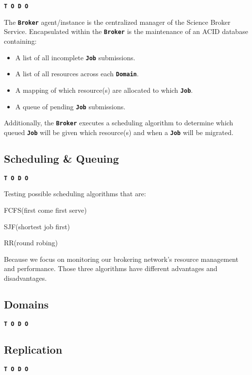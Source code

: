 \documentclass{ReportCUNY}
\newcommand{\KeyWord}[1]{\textbf{\texttt{#1}}}
\begin{document}
\begin{center}\textbf{\texttt{T~O~D~O}}\end{center}

The \KeyWord{Broker} agent/instance is the centralized manager of the Science Broker Service.
Encapsulated within the \KeyWord{Broker} is the maintenance of an ACID database containing:
\begin{itemize}
\item A list of all incomplete \KeyWord{Job} submissions.
\item A list of all resources across each \KeyWord{Domain}.
\item A mapping of which resource(s) are allocated to which \KeyWord{Job}.
\item A queue of pending \KeyWord{Job} submissions.
\end{itemize}

Additionally, the \KeyWord{Broker} executes a scheduling algorithm to determine which queued \KeyWord{Job} will be given which resource(s) and when a \KeyWord{Job} will be migrated.


\subsection{Scheduling \& Queuing}

\begin{center}\textbf{\texttt{T~O~D~O}}\end{center}
Testing possible scheduling algorithms that are:
\item FCFS(first come first serve)
\item SJF(shortest job first)
\item RR(round robing)

Because we focus on monitoring our brokering network's resource management and performance. Those three algorithms have different advantages and disadvantages. 
\subsection{Domains}

\begin{center}\textbf{\texttt{T~O~D~O}}\end{center}


\subsection{Replication}

\begin{center}\textbf{\texttt{T~O~D~O}}\end{center}
\end{document}
